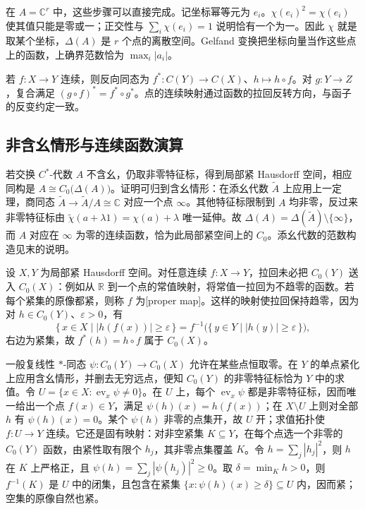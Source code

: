 \ProseParagraphBreak
在 \(A=\mathbb C^r\) 中，这些步骤可以直接完成。记坐标幂等元为 \(e_i\)。\(\chi(e_i)^2=\chi(e_i)\) 使其值只能是零或一；正交性与 \(\sum_i\chi(e_i)=1\) 说明恰有一个为一。因此 \(\chi\) 就是取某个坐标，\(\Delta(A)\) 是 \(r\) 个点的离散空间。Gelfand 变换把坐标向量当作这些点上的函数，上确界范数恰为 \(\max_i|a_i|\)。

\ProseParagraphBreak
若 \(f:X\to Y\) 连续，则反向同态为 \(f^*:C(Y)\to C(X)\)、\(h\mapsto h\circ f\)。对 \(g:Y\to Z\)，复合满足 \((g\circ f)^*=f^*\circ g^*\)。点的连续映射通过函数的拉回反转方向，与函子的反变约定一致。

\subsection{非含幺情形与连续函数演算}
\label{b2:subsec:D02:02}

若交换 \(C^*\)-代数 \(A\) 不含幺，仍取非零特征标，得到局部紧 Hausdorff 空间，相应同构是 \(A\cong C_0\bigl(\Delta(A)\bigr)\)。证明可归到含幺情形：在添幺代数 \(\widetilde A\) 上应用上一定理，商同态 \(\widetilde A\to\widetilde A/A\cong\mathbb C\) 对应一个点 \(\infty\)。其他特征标限制到 \(A\) 均非零，反过来非零特征标由 \(\widetilde\chi(a+\lambda1)=\chi(a)+\lambda\) 唯一延伸。故 \(\Delta(A)=\Delta(\widetilde A)\setminus\{\infty\}\)，而 \(A\) 对应在 \(\infty\) 为零的连续函数，恰为此局部紧空间上的 \(C_0\)。添幺代数的范数构造见末的说明。

\ProseParagraphBreak
设 \(X,Y\) 为局部紧 Hausdorff 空间。对任意连续 \(f:X\to Y\)，拉回未必把 \(C_0(Y)\) 送入 \(C_0(X)\)：例如从 \(\mathbb R\) 到一个点的常值映射，将常值一拉回为不趋零的函数。若每个紧集的原像都紧，则称 \(f\) 为[proper map]。这样的映射使拉回保持趋零，因为对 \(h\in C_0(Y)\)、\(\varepsilon>0\)，有
\[
	\{\,x\in X\mid |h(f(x))|\ge\varepsilon\,\} =f^{-1}\bigl(\{\,y\in Y\mid |h(y)|\ge\varepsilon\,\}\bigr),
\]
右边为紧集，故 \(f^*(h)=h\circ f\) 属于 \(C_0(X)\)。

\ProseParagraphBreak
一般复线性 \(*\)-同态 \(\psi:C_0(Y)\to C_0(X)\) 允许在某些点恒取零。在 \(Y\) 的单点紧化上应用含幺情形，并删去无穷远点，便知 \(C_0(Y)\) 的非零特征标恰为 \(Y\) 中的求值。令 \(U=\{x\in X:\operatorname{ev}_x\psi\ne0\}\)。在 \(U\) 上，每个 \(\operatorname{ev}_x\psi\) 都是非零特征标，因而唯一给出一个点 \(f(x)\in Y\)，满足 \(\psi(h)(x)=h(f(x))\)；在 \(X\setminus U\) 上则对全部 \(h\) 有 \(\psi(h)(x)=0\)。某个 \(\psi(h)\) 非零的点集开，故 \(U\) 开；求值拓扑使 \(f:U\to Y\) 连续。它还是固有映射：对非空紧集 \(K\subseteq Y\)，在每个点选一个非零的 \(C_0(Y)\) 函数，由紧性取有限个 \(h_j\)，其非零点集覆盖 \(K\)。令 \(h=\sum_j|h_j|^2\)，则 \(h\) 在 \(K\) 上严格正，且 \(\psi(h)=\sum_j|\psi(h_j)|^2\ge0\)。取 \(\delta=\min_K h>0\)，则 \(f^{-1}(K)\) 是 \(U\) 中的闭集，且包含在紧集 \(\{x:\psi(h)(x)\ge\delta\}\subseteq U\) 内，因而紧；空集的原像自然也紧。

